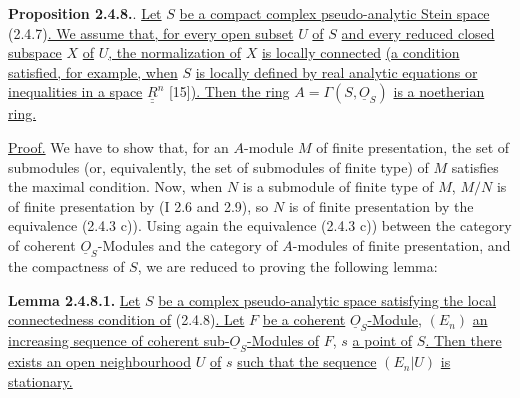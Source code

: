 \providecommand{\Qcoh}{\operatorname{Qcoh}}
\providecommand{\Mod}{\operatorname{Mod}}
\providecommand{\Coh}{\operatorname{Coh}}
\renewcommand{\Ob}{\operatorname{ob}}
\providecommand{\Hom}{\operatorname{Hom}}
\providecommand{\Ext}{\operatorname{Ext}}
\providecommand{\Spec}{\operatorname{Spec}}
\providecommand{\qcoh}{\mathrm{qcoh}}
\providecommand{\parf}{\mathrm{parf}}
\providecommand{\coh}{\mathrm{coh}}
\providecommand{\Loclib}{\operatorname{Loclib}}
\providecommand{\Lib}{\operatorname{Lib}}
\providecommand{\im}{\operatorname{Im}}

%
%
\textbf{Proposition 2.4.8.}. \uline{Let} $S$ \uline{be a compact complex pseudo-analytic Stein space} (2.4.7)\uline{. We assume that, for every open subset} $U$ \uline{of} $S$ \uline{and every reduced closed subspace} $X$ \uline{of} $U$\uline{, the normalization of} $X$ \uline{is locally connected} \uline{(a condition satisfied, for example, when} $S$ \uline{is locally defined by real analytic equations or inequalities in a space} $\underline{\underline{R}}^n$ [15]\uline{). Then the ring} $A=\Gamma(S,\underline{O}_S)$ \uline{is a noetherian ring.}

\uline{Proof.} We have to show that, for an $A$-module $M$ of finite presentation, the set of submodules (or, equivalently, the set of submodules of finite type) of $M$ satisfies the maximal condition. Now, when $N$ is a submodule of finite type of $M$, $M/N$ is of finite presentation by (I 2.6 and 2.9), so $N$ is of finite presentation by the equivalence (2.4.3 c)). Using again the equivalence (2.4.3 c)) between the category of coherent $\underline{O}_S$-Modules and the category of $A$-modules of finite presentation, and the compactness of $S$, we are reduced to proving the following lemma:

\textbf{Lemma 2.4.8.1.} \uline{Let} $S$ \uline{be a complex pseudo-analytic space satisfying the local connectedness condition of} (2.4.8)\uline{. Let} $F$ \uline{be a coherent} $\underline{O}_S$\uline{-Module,} $(E_n)$ \uline{an increasing sequence of coherent sub-}$\underline{O}_S$\uline{-Modules of} $F$, $s$ \uline{a point of} $S$\uline{. Then there exists an open neighbourhood} $U$ \uline{of} $s$ \uline{such that the sequence} $(E_n|U)$ \uline{is stationary.}


